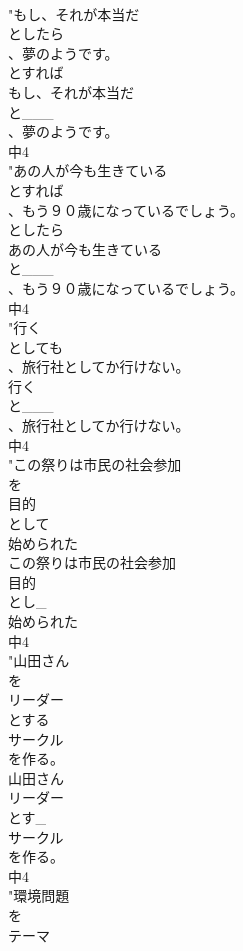 \documentclass[8pt]{extreport}
\begin{document}
\begin{CJK}{UTF8}{min}
\\	"もし、それが本当だ
\\	としたら
\\	、夢のようです。
\\	とすれば
\\	もし、それが本当だ
\\	と___
\\	、夢のようです。
\\	中4
\\	"あの人が今も生きている
\\	とすれば
\\	、もう９０歳になっているでしょう。
\\	としたら
\\	あの人が今も生きている
\\	と___
\\	、もう９０歳になっているでしょう。
\\	中4
\\	"行く
\\	としても
\\	、旅行社としてか行けない。
\\	行く
\\	と___
\\	、旅行社としてか行けない。
\\	中4
\\	"この祭りは市民の社会参加
\\	を
\\	目的
\\	として
\\	始められた
\\	この祭りは市民の社会参加
\\	目的
\\	とし_
\\	始められた
\\	中4
\\	"山田さん
\\	を
\\	リーダー
\\	とする
\\	サークル
\\	を作る。
\\	山田さん
\\	リーダー
\\	とす_
\\	サークル
\\	を作る。
\\	中4
\\	"環境問題
\\	を
\\	テーマ

\end{CJK}
\end{document}
